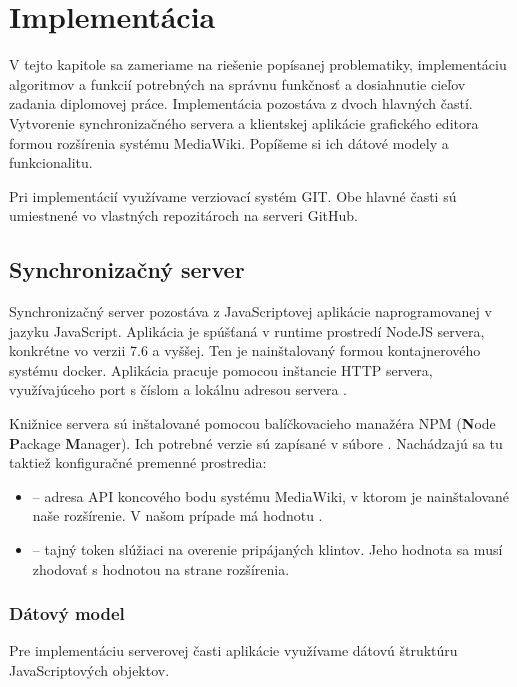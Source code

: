 \chapter{Implementácia}\label{chap:implementation}
V tejto kapitole sa zameriame na riešenie popísanej problematiky, implementáciu algoritmov a funkcií potrebných na správnu funkčnosť a dosiahnutie cieľov zadania diplomovej práce. Implementácia pozostáva z dvoch hlavných častí. Vytvorenie synchronizačného servera a klientskej aplikácie grafického editora formou rozšírenia systému MediaWiki. Popíšeme si ich dátové modely a funkcionalitu. 

Pri implementácií využívame verziovací systém GIT. Obe hlavné časti sú umiestnené vo vlastných repozitároch na serveri GitHub. 

\section{Synchronizačný server}
Synchronizačný server pozostáva z JavaScriptovej aplikácie naprogramovanej v jazyku JavaScript. Aplikácia je spúšťaná v runtime prostredí NodeJS servera, konkrétne vo verzii 7.6 a vyššej. Ten je nainštalovaný formou kontajnerového systému docker. Aplikácia pracuje pomocou inštancie HTTP servera, využívajúceho port s číslom  a lokálnu adresou servera . 

Knižnice servera sú inštalované pomocou balíčkovacieho manažéra NPM (\textbf{N}ode \textbf{P}ackage \textbf{M}anager). Ich potrebné verzie sú zapísané v súbore . Nachádzajú sa tu taktiež konfiguračné premenné prostredia:

\begin{itemize}
	\item {} -- adresa API koncového bodu systému MediaWiki, v ktorom je nainštalované naše rozšírenie. V našom prípade má hodnotu .
	
	\item {} -- tajný token slúžiaci na overenie pripájaných klintov. Jeho hodnota sa musí zhodovať s hodnotou na strane rozšírenia.
\end{itemize}

\subsection{Dátový model}
Pre implementáciu serverovej časti aplikácie využívame dátovú štruktúru JavaScriptových objektov.


